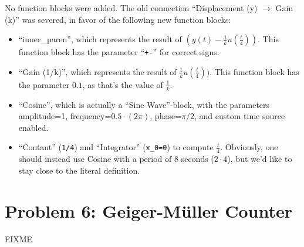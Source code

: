 \documentclass[a4paper,parskip,headheight=38pt]{scrartcl} %
\begin{document}
No function blocks were added.  The old connection
\enquote{Displacement (y) $\rightarrow$ Gain (k)} was severed, in favor
of the following new function blocks:
\begin{itemize}
    \item \enquote{inner\_paren}, which represents the result of $(y(t)
    - \frac{1}{k}u(\frac{t}{4}))$.  This function block has the parameter
    \enquote{\texttt{+-}} for correct signs.
    \item \enquote{Gain (1/k)}, which represents the result of
    $\frac{1}{k}u(\frac{t}{4}))$.  This function block has the parameter $0.1$,
    as that's the value of $\frac{1}{k}$.
    \item \enquote{Cosine}, which is actually a \enquote{Sine
    Wave}-block, with the parameters amplitude=1,
    frequency=$0.5 \cdot (2\pi)$, phase=$\pi/2$,
    and custom time source enabled.
    \item \enquote{Contant} (\texttt{1/4}) and \enquote{Integrator}
    (\texttt{x\_0=0}) to compute $\frac{t}{4}$.  Obviously, one should
    instead use Cosine with a period of 8 seconds ($2 \cdot 4$), but
    we'd like to stay close to the literal definition.
\end{itemize}


\section*{Problem 6: Geiger-Müller Counter}

FIXME
\end{document}
